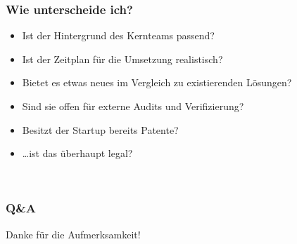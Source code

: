 \documentclass{beamer}
\begin{document}
\begin{frame}
    \frametitle{Wie unterscheide ich?}
    \begin{itemize}
        \item<1-> Ist der Hintergrund des Kernteams passend?
        \item<2-> Ist der Zeitplan für die Umsetzung realistisch?
        \item<3-> Bietet es etwas neues im Vergleich zu existierenden Lösungen?
        \item<4-> Sind sie offen für externe Audits und Verifizierung?
        \item<5-> Besitzt der Startup bereits Patente?
        \item<6-> \dots ist das überhaupt legal?
    \end{itemize} ~\\
\end{frame}

\begin{frame}
    \frametitle{Q\&A}
    \pause
    Danke für die Aufmerksamkeit!
\end{frame}


    
\end{document}
